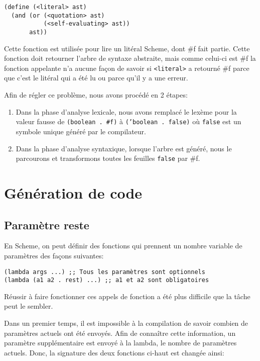 \documentclass[11pt]{report}
\begin{document}
\begin{verbatim}
(define (<literal> ast)
  (and (or (<quotation> ast)
           (<self-evaluating> ast))
       ast))
\end{verbatim}

Cette fonction est utilisée pour lire un litéral Scheme, dont \#f fait
partie.  Cette fonction doit retourner l'arbre de syntaxe abstraite,
mais comme celui-ci est \#f la fonction appelante n'a aucune façon de
savoir si {\tt <literal>} a retourné \#f parce que c'est le litéral
qui a été lu ou parce qu'il y a une erreur.

Afin de régler ce problème, nous avons procédé en 2 étapes:

\begin{enumerate}
\item Dans la phase d'analyse lexicale, nous avons remplacé le lexème
  pour la valeur fausse de {\tt (boolean . \#f)} à {\tt ('boolean .
    false)} où {\tt false} est un symbole unique généré par le
  compilateur.
\item Dans la phase d'analyse syntaxique, lorsque l'arbre est généré,
  nous le parcourons et transformons toutes les feuilles {\tt false}
  par \#f.
\end{enumerate}

\section{Génération de code}

\subsection{Paramètre reste}

En Scheme, on peut définir des fonctions qui prennent un nombre
variable de paramètres des façons suivantes:

\begin{verbatim}
(lambda args ...) ;; Tous les paramètres sont optionnels
(lambda (a1 a2 . rest) ...) ;; a1 et a2 sont obligatoires
\end{verbatim}

Réussir à faire fonctionner ces appels de fonction a été plus
difficile que la tâche peut le sembler.

Dans un premier temps, il est impossible à la compilation de savoir
combien de paramètres actuels ont été envoyés.  Afin de connaître
cette information, un paramètre supplémentaire est envoyé à la lambda,
le nombre de paramètres actuels.  Donc, la signature des deux
fonctions ci-haut est changée ainsi:
\end{document}
